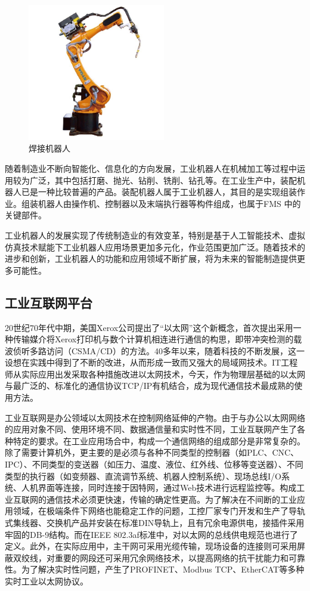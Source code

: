 \documentclass[lang=cn,12pt,bibtex,newtx,twoside,margintrue,citestyle=gb7714-2015, bibstyle=gb7714-2015]{elegantbook}
\begin{document}
\begin{figure}[htbp]
\centering
\includegraphics[angle=0,width=6cm]{./figure/2.10.jpg}
\caption{\label{2.10}焊接机器人}
\end{figure}

随着制造业不断向智能化、信息化的方向发展，工业机器人在机械加工等过程中运用较为广泛，其中包括打磨、抛光、钻削、铣削、钻孔等。在工业生产中，装配机器人已是一种比较普遍的产品。装配机器人属于工业机器人，其目的是实现组装作业。组装机器人由操作机、控制器以及末端执行器等构件组成，也属于FMS 中的关键部件。

工业机器人的发展实现了传统制造业的有效变革，特别是基于人工智能技术、虚拟仿真技术赋能下工业机器人应用场景更加多元化，作业范围更加广泛。随着技术的进步和创新，工业机器人的功能和应用领域不断扩展，将为未来的智能制造提供更多可能性。

\subsection{工业互联网平台}
\label{sec:org7d30be9}
20世纪70年代中期，美国Xerox公司提出了“以太网”这个新概念，首次提出采用一种传输媒介将Xerox打印机与数个计算机相连进行通信的构思，即带冲突检测的载波侦听多路访问（CSMA/CD）的方法。40多年以来，随着科技的不断发展，这一设想在实践中得到了不断的改进，从而形成一致而又强大的局域网技术。IT工程师从实际应用出发采取各种措施改进以太网技术，今天，作为物理层基础的以太网与最广泛的、标准化的通信协议TCP/IP有机结合，成为现代通信技术最成熟的使用方法。

工业互联网是办公领域以太网技术在控制网络延伸的产物。由于与办公以太网网络的应用对象不同、使用环境不同、数据通信量和实时性不同，工业互联网产生了各种特定的要求。在工业应用场合中，构成一个通信网络的组成部分是非常复杂的。除了需要计算机外，更主要的是必须与各种不同类型的控制器（如PLC、CNC、IPC）、不同类型的变送器（如压力、温度、液位、红外线、位移等变送器）、不同类型的执行器（如变频器、直流调节系统、机器人控制系统）、现场总线I/O系统、人机界面等连接，同时连接于因特网，通过Web技术进行远程监控等。构成工业互联网的通信技术必须更快速，传输的确定性更高。为了解决在不间断的工业应用领域，在极端条件下网络也能稳定工作的问题，工控厂家专门开发和生产了导轨式集线器、交换机产品并安装在标准DIN导轨上，且有冗余电源供电，接插件采用牢固的DB-9结构。而在IEEE 802.3af标准中，对以太网的总线供电规范也进行了定义。此外，在实际应用中，主干网可采用光缆传输，现场设备的连接则可采用屏蔽双绞线，对重要的网段还可采用冗余网络技术，以提高网络的抗干扰能力和可靠性。为了解决实时性问题，产生了PROFINET、Modbus TCP、EtherCAT等多种实时工业以太网协议。
\end{document}
